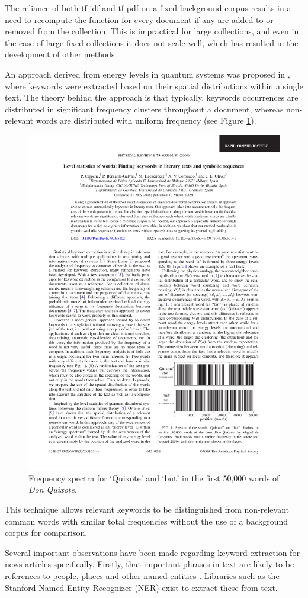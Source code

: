 The reliance of both tf-idf and tf-pdf on a fixed background corpus results in a need to recompute the function for every document if any are added to or removed from the collection. This is impractical for large collections, and even in the case of large fixed collections it does not scale well, which has resulted in the development of other methods.

An approach derived from energy levels in quantum systems was proposed in \cite{LevelStatisticsOfWords}, where keywords were extracted based on their spatial distributions within a single text. The theory behind the approach is that typically, keywords occurrences are distributed in significant frequency clusters throughout a document, whereas non-relevant words are distributed with uniform frequency (see Figure \ref{fig:ols-spectra}).

\begin{figure}[htbp!]
	\centering
	\includegraphics[width=.6\textwidth]{img/lit-survey/ols-keyword-spectra.pdf}
	\caption{Frequency spectra for `Quixote' and `but' in the first 50,000 words of \textit{Don Quixote}. \citep{LevelStatisticsOfWords}}
	\label{fig:ols-spectra}
\end{figure}

This technique allows relevant keywords to be distinguished from non-relevant common words with similar total frequencies without the use of a background corpus for comparison.

Several important observations have been made regarding keyword extraction for news articles specifically. Firstly, that important phrases in text are likely to be references to people, places and other named entities \citep{NewsStand}. Libraries such as the Stanford Named Entity Recognizer (NER) \citep{NestedNamedEntityRecognition} exist to extract these from text. 

